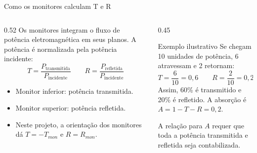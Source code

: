 \documentclass[aspectratio=169,10pt]{beamer}
\begin{document}
\begin{frame}{Como os monitores calculam T e R}
\begin{columns}[T,onlytextwidth]
  \begin{column}{0.52\textwidth}
    \small
    Os monitores integram o fluxo de potência eletromagnética em seus planos. A potência é normalizada pela potência incidente:
    \vspace{0.2cm}
    \[
      T=\frac{P_{\mathrm{transmitida}}}{P_{\mathrm{incidente}}}
      \qquad
      R=\frac{P_{\mathrm{refletida}}}{P_{\mathrm{incidente}}}
    \]
    \begin{itemize}\setlength\itemsep{0.5em}
      \item Monitor inferior: potência transmitida.
      \item Monitor superior: potência refletida.
      \item Neste projeto, a orientação dos monitores dá $T=-T_{mon}$ e $R=R_{mon}$.
    \end{itemize}
  \end{column}
  \begin{column}{0.45\textwidth}
    \begin{block}{Exemplo ilustrativo}
      \small Se chegam 10 unidades de potência, 6 atravessam e 2 retornam:
      \[
        T=\frac{6}{10}=0{,}6 \qquad R=\frac{2}{10}=0{,}2
      \]
      Assim, 60\% é transmitido e 20\% é refletido. A absorção é $A=1-T-R=0{,}2$.
    \end{block}
    \footnotesize A relação para $A$ requer que toda a potência transmitida e refletida seja contabilizada.
  \end{column}
\end{columns}
\end{frame}
\end{document}
